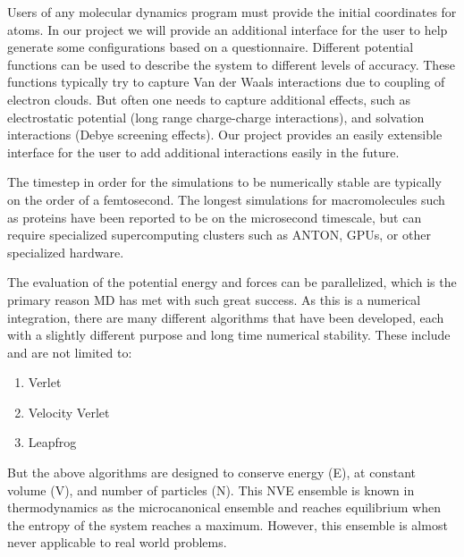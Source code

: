 \documentclass[10pt]{article}
\begin{document}
Users of any molecular dynamics program must provide the initial coordinates for atoms.  In our project we will provide an additional interface for the user to help generate some configurations based on a questionnaire. Different potential functions can be used to describe the system to different levels of accuracy. These functions typically try to capture Van der Waals interactions due to coupling of electron clouds.  But often one needs to capture additional effects, such as electrostatic potential (long range charge-charge interactions), and solvation interactions (Debye screening effects). Our project provides an easily extensible interface for the user to add additional interactions easily in the future.

The timestep in order for the simulations to be numerically stable are typically on the order of a femtosecond. The longest simulations for macromolecules such as proteins have been reported to be on the microsecond timescale, but can require specialized supercomputing clusters such as ANTON, GPUs, or other specialized hardware.


The evaluation of the potential energy and forces can be parallelized, which is the primary reason MD has met with such great success.  As this is a numerical integration, there are many different algorithms that have been developed, each with a slightly different purpose and long time numerical stability.  These include and are not limited to:

\begin{enumerate}
    \item Verlet
    \item Velocity Verlet
    \item Leapfrog
\end{enumerate}

But the above algorithms are designed to conserve energy (E), at constant volume (V), and number of particles (N).  This NVE ensemble is known in thermodynamics as the microcanonical ensemble and reaches equilibrium when the entropy of the system reaches a maximum. However, this ensemble is almost never applicable to real world problems.
\end{document}

